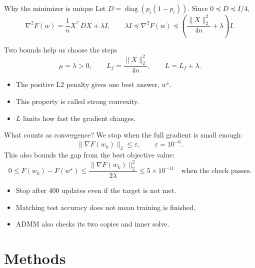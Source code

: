 \documentclass[10pt,aspectratio=169]{beamer}
\begin{document}
\begin{frame}{Why the minimizer is unique}
Let $D=\operatorname{diag}(p_i(1-p_i))$. Since $0\preceq D\preceq I/4$,
\[
\nabla^2F(w)=\frac{1}{n}X^\top D X+\lambda I,
\qquad
\lambda I\preceq\nabla^2F(w)\preceq
\left(\frac{\|X\|_2^2}{4n}+\lambda\right)I.
\]
\begin{block}{Two bounds help us choose the steps}
\[
\mu=\lambda>0,\qquad L_f=\frac{\|X\|_2^2}{4n},\qquad L=L_f+\lambda.
\]
\end{block}
\begin{itemize}
  \item The positive L2 penalty gives one best answer, $w^\star$.
  \item This property is called \alert{strong convexity}.
  \item $L$ limits how fast the gradient changes.
\end{itemize}
\end{frame}

\begin{frame}{What counts as convergence?}
We stop when the full gradient is small enough:
\[
\|\nabla F(w_k)\|_2\leq\varepsilon,\qquad \varepsilon=10^{-6}.
\]
This also bounds the gap from the best objective value:
\[
0\leq F(w_k)-F(w^\star)
\leq\frac{\|\nabla F(w_k)\|_2^2}{2\lambda}
\leq 5\times10^{-11}\quad\text{when the check passes.}
\]
\begin{itemize}
  \item Stop after 400 updates even if the target is not met.
  \item Matching test accuracy does not mean training is finished.
  \item ADMM also checks its two copies and inner solve.
\end{itemize}
\end{frame}

\section{Methods}
\end{document}

